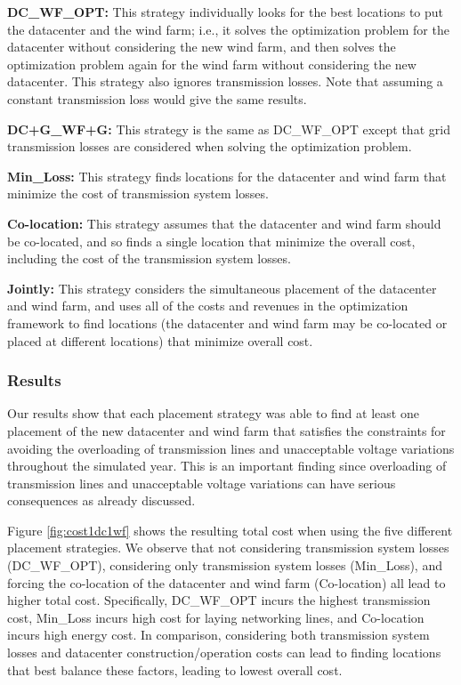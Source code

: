 \textbf{DC\_WF\_OPT:} This strategy individually looks for the best
locations to put the datacenter and the wind farm; i.e., it solves the
optimization problem for the datacenter without considering the new
wind farm, and then solves the optimization problem again for the wind
farm without considering the new datacenter.  This strategy also
ignores transmission losses.  Note that assuming
a constant transmission loss would give the same results.

\textbf{DC+G\_WF+G:} This strategy is the same as DC\_WF\_OPT except
that grid transmission losses are considered when solving the optimization
problem.

\textbf{Min\_Loss:} This strategy finds locations for the datacenter
and wind farm that minimize the cost of transmission system losses.

\textbf{Co-location:} This strategy assumes that the datacenter and
wind farm should be co-located, and so finds a single location
that minimize the overall cost, including the cost of
the transmission system losses.

\textbf{Jointly:} This strategy considers the simultaneous placement
of the datacenter and wind farm, and uses all of the costs and
revenues in the optimization framework to find locations (the
datacenter and wind farm may be co-located or placed at different
locations) that minimize overall cost.

\subsubsection{Results}

Our results show that each placement strategy was able to find at
least one placement of the new datacenter and wind farm that satisfies
the constraints for avoiding the overloading of transmission lines and
unacceptable voltage variations throughout the simulated year.  This
is an important finding since overloading of transmission lines and
unacceptable voltage variations can have serious consequences as
already discussed.

Figure \ref{fig:cost1dc1wf} shows the resulting total cost when using
the five different placement strategies.  We observe that not
considering transmission system losses (DC\_WF\_OPT), considering only
transmission system losses (Min\_Loss), and forcing the co-location of
the datacenter and wind farm (Co-location) all lead to higher total cost.
Specifically, DC\_WF\_OPT incurs the highest transmission cost,
Min\_Loss incurs high cost for laying networking lines, and
Co-location incurs high energy cost.  In comparison, considering both
transmission system losses and datacenter construction/operation costs
can lead to finding locations that best balance these factors, leading
to lowest overall cost.

